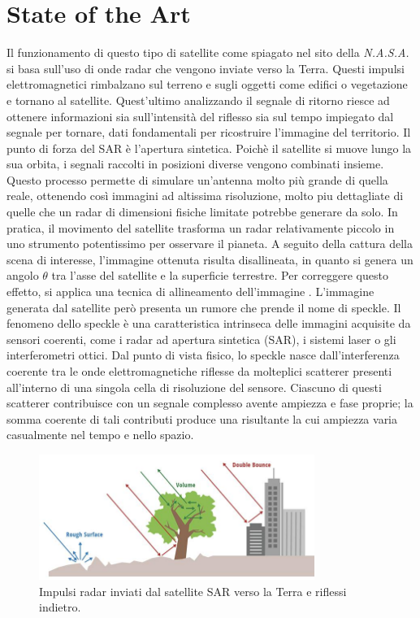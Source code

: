 \chapter{State of the Art}
Il funzionamento 
di questo tipo di satellite come spiagato nel sito della \textit{N.A.S.A.} \cite{nasa_sar} si basa sull'uso di  onde radar che vengono inviate verso la Terra. 
Questi impulsi elettromagnetici rimbalzano sul terreno e sugli 
oggetti come edifici o vegetazione e tornano al satellite. 
Quest'ultimo analizzando il segnale di 
ritorno riesce ad ottenere informazioni sia sull'intensità del riflesso sia sul tempo impiegato 
dal segnale per tornare, dati fondamentali per ricostruire l'immagine del territorio. Il punto 
di forza del SAR è l'apertura sintetica. Poichè il satellite si muove lungo la sua orbita, i 
segnali raccolti in posizioni diverse vengono combinati insieme. Questo processo permette di 
simulare un'antenna molto più grande di quella reale, ottenendo così immagini ad altissima 
risoluzione, molto piu dettagliate di quelle che un radar di dimensioni fisiche limitate potrebbe 
generare da solo. In pratica, il movimento del satellite trasforma un radar relativamente piccolo 
in uno strumento potentissimo per osservare il pianeta. 
A seguito della cattura della scena di interesse, l’immagine ottenuta risulta disallineata, 
in quanto si genera un angolo $\theta$ tra l’asse del satellite e la superficie terrestre. 
Per correggere questo effetto, si applica una tecnica di allineamento dell’immagine \cite{HUGHES2020166}.
L'immagine generata dal satellite però presenta un rumore che prende il nome di speckle.   
Il fenomeno dello speckle è una caratteristica intrinseca delle immagini acquisite da sensori coerenti, 
come i radar ad apertura sintetica (SAR), i sistemi laser o gli interferometri ottici. 
Dal punto di vista fisico, lo speckle nasce dall’interferenza coerente tra le onde elettromagnetiche riflesse 
da molteplici scatterer presenti all’interno di una singola cella di risoluzione del sensore. 
Ciascuno di questi scatterer contribuisce con un segnale complesso avente ampiezza e fase proprie; 
la somma coerente di tali contributi produce una risultante la cui ampiezza varia casualmente nel tempo e nello spazio.
\begin{figure}[H]
  \centering
  \includegraphics[width=0.8\textwidth]{utils/SARPolarization.jpg}
  \caption{Impulsi radar inviati dal satellite SAR verso la Terra e riflessi indietro.}
  \label{fig:sar_scatter}
\end{figure}  
